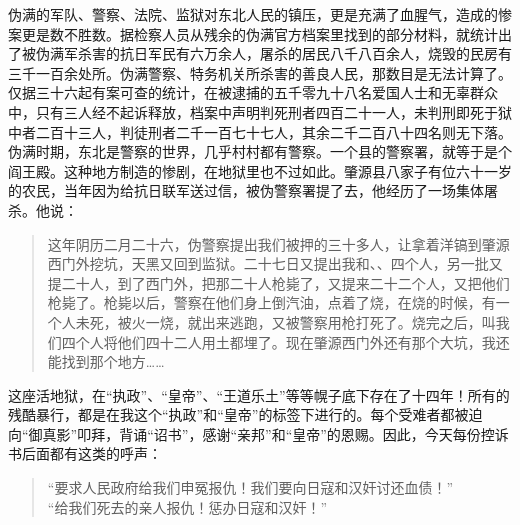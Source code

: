 伪满的军队、警察、法院、监狱对东北人民的镇压，更是充满了血腥气，造成的惨案更是数不胜数。据检察人员从残余的伪满官方档案里找到的部分材料，就统计出了被伪满军杀害的抗日军民有六万余人，屠杀的居民八千八百余人，烧毁的民房有三千一百余处所。伪满警察、特务机关所杀害的善良人民，那数目是无法计算了。仅据三十六起有案可查的统计，在被逮捕的五千零九十八名爱国人士和无辜群众中，只有三人经不起诉释放，档案中声明判死刑者四百二十一人，未判刑即死于狱中者二百十三人，判徒刑者二千一百七十七人，其余二千二百八十四名则无下落。伪满时期，东北是警察的世界，几乎村村都有警察。一个县的警察署，就等于是个阎王殿。这种地方制造的惨剧，在地狱里也不过如此。肇源县八家子有位六十一岁的农民，当年因为给抗日联军送过信，被伪警察署提了去，他经历了一场集体屠杀。他说：\\

\begin{quote}
	这年阴历二月二十六，伪警察提出我们被押的三十多人，让拿着洋镐到肇源西门外挖坑，天黑又回到监狱。二十七日又提出我和、、四个人，另一批又提二十人，到了西门外，把那二十人枪毙了，又提来二十二个人，又把他们枪毙了。枪毙以后，警察在他们身上倒汽油，点着了烧，在烧的时候，有一个人未死，被火一烧，就出来逃跑，又被警察用枪打死了。烧完之后，叫我们四个人将他们四十二人用土都埋了。现在肇源西门外还有那个大坑，我还能找到那个地方……\\
\end{quote}

这座活地狱，在“执政”、“皇帝”、“王道乐土”等等幌子底下存在了十四年！所有的残酷暴行，都是在我这个“执政”和“皇帝”的标签下进行的。每个受难者都被迫向“御真影”叩拜，背诵“诏书”，感谢“亲邦”和“皇帝”的恩赐。因此，今天每份控诉书后面都有这类的呼声：\\

\begin{quote}
	“要求人民政府给我们申冤报仇！我们要向日寇和汉奸讨还血债！”\\

“给我们死去的亲人报仇！惩办日寇和汉奸！”
\end{quote}
